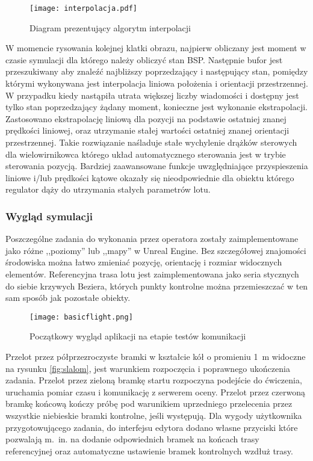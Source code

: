 \begin{figure}[!h]
    \centering \texttt{[image: interpolacja.pdf]}
    \caption{Diagram prezentujący algorytm interpolacji}
    \label{fig:interpolacja}
\end{figure}

W momencie rysowania kolejnej klatki obrazu, najpierw obliczany jest moment w czasie symulacji dla którego należy obliczyć stan BSP. Następnie bufor jest przeszukiwany aby znaleźć najbliższy poprzedzający i następujący stan, pomiędzy którymi wykonywana jest interpolacja liniowa położenia i orientacji przestrzennej. W przypadku kiedy nastąpiła utrata większej liczby wiadomości i dostępny jest tylko stan poprzedzający żądany moment, konieczne jest wykonanie ekstrapolacji. Zastosowano ekstrapolację liniową dla pozycji na podstawie ostatniej znanej prędkości liniowej, oraz utrzymanie stałej wartości ostatniej znanej orientacji przestrzennej. Takie rozwiązanie naśladuje stałe wychylenie drążków sterowych dla wielowirnikowca którego układ automatycznego sterowania jest w trybie sterowania pozycją. Bardziej zaawansowane funkcje uwzględniające przyspieszenia liniowe i/lub prędkości kątowe okazały się nieodpowiednie dla obiektu którego regulator dąży do utrzymania stałych parametrów lotu.

\subsubsection{Wygląd symulacji}
Poszczególne zadania do wykonania przez operatora zostały zaimplementowane jako różne ,,poziomy'' lub ,,mapy'' w Unreal Engine. Bez szczegółowej znajomości środowiska można łatwo zmieniać pozycję, orientację i rozmiar widocznych elementów. Referencyjna trasa lotu jest zaimplementowana jako seria stycznych do siebie krzywych Beziera, których punkty kontrolne można przemieszczać w ten sam sposób jak pozostałe obiekty.

\begin{figure}[!h]
    \centering \texttt{[image: basicflight.png]}
    \caption{Początkowy wygląd aplikacji na etapie testów komunikacji}
    \label{fig:basicflight}
\end{figure}

Przelot przez półprzezroczyste bramki w kształcie kół o promieniu 1~m widoczne na rysunku \ref{fig:slalom}, jest warunkiem rozpoczęcia i poprawnego ukończenia zadania. Przelot przez zieloną bramkę startu rozpoczyna podejście do ćwiczenia, uruchamia pomiar czasu i komunikację z serwerem oceny. Przelot przez czerwoną bramkę końcową kończy próbę pod warunikiem uprzedniego przelecenia przez wszystkie niebieskie bramki kontrolne, jeśli występują. Dla wygody użytkownika przygotowującego zadania, do interfejsu edytora dodano własne przyciski które pozwalają m.~in. na dodanie odpowiednich bramek na końcach trasy referencyjnej oraz automatyczne ustawienie bramek kontrolnych wzdłuż trasy.

